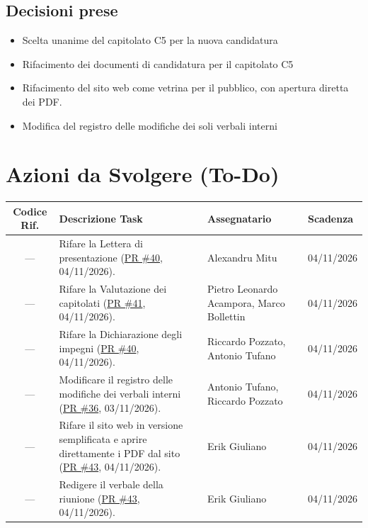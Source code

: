 \documentclass[a4paper, 11pt]{article}
\begin{document}
\subsection{Decisioni prese}
\begin{itemize}
    \item Scelta unanime del capitolato C5 per la nuova candidatura
    \item Rifacimento dei documenti di candidatura per il capitolato C5
    \item Rifacimento del sito web come vetrina per il pubblico, con apertura diretta dei PDF.
    \item Modifica del registro delle modifiche dei soli verbali interni
\end{itemize}

\vspace{0.5cm}
\section{Azioni da Svolgere (To-Do)}
\begin{tabularx}{\textwidth}{|c|X|>{\raggedright\arraybackslash}p{3.6cm}|l|}
\hline
\textbf{Codice Rif.} & \textbf{Descrizione Task} & \textbf{Assegnatario} & \textbf{Scadenza} \\ \hline
--- & Rifare la Lettera di presentazione (\href{https://github.com/BitCrusher-Team/Progetto_SWE_26-27/pull/40}{PR \#40}, 04/11/2026). & Alexandru Mitu & 04/11/2026 \\ \hline
--- & Rifare la Valutazione dei capitolati (\href{https://github.com/BitCrusher-Team/Progetto_SWE_26-27/pull/41}{PR \#41}, 04/11/2026). & Pietro Leonardo Acampora, Marco Bollettin & 04/11/2026 \\ \hline
--- & Rifare la Dichiarazione degli impegni (\href{https://github.com/BitCrusher-Team/Progetto_SWE_26-27/pull/40}{PR \#40}, 04/11/2026). & Riccardo Pozzato, Antonio Tufano & 04/11/2026 \\ \hline
--- & Modificare il registro delle modifiche dei verbali interni (\href{https://github.com/BitCrusher-Team/Progetto_SWE_26-27/pull/36}{PR \#36}, 03/11/2026). & Antonio Tufano, Riccardo Pozzato & 04/11/2026 \\ \hline
--- & Rifare il sito web in versione semplificata e aprire direttamente i PDF dal sito (\href{https://github.com/BitCrusher-Team/Progetto_SWE_26-27/pull/43}{PR \#43}, 04/11/2026). & Erik Giuliano & 04/11/2026 \\ \hline
--- & Redigere il verbale della riunione (\href{https://github.com/BitCrusher-Team/Progetto_SWE_26-27/pull/43}{PR \#43}, 04/11/2026). & Erik Giuliano & 04/11/2026 \\ \hline
\end{tabularx}
\end{document}
